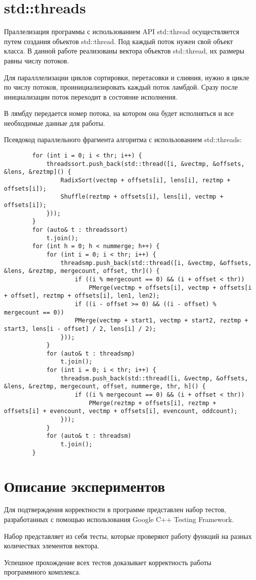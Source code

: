\documentclass{report}
\begin{document}
	\section*{std::threads}
	Праллелизация программы с использованием API std::thread осуществляется путем создания объектов std::thread. Под каждый поток нужен свой объект класса. В данной работе реализованы вектора объектов std::thread, их размеры равны числу потоков.
	\par Для паралллелизации циклов сортировки, перетасовки и слияния, нужно в цикле по числу потоков, проинициализировать каждый поток ламбдой. Сразу после инициализации поток переходит в состояние исполнения. 
	\par В лямбду передается номер потока, на котором она будет исполняться и все необходимые данные для работы.
	\par Псевдокод параллельного фрагмента алгоритма с использованием std::threads:
	\begin{lstlisting}
		for (int i = 0; i < thr; i++) {
			threadssort.push_back(std::thread([i, &vectmp, &offsets, &lens, &reztmp]() {
				RadixSort(vectmp + offsets[i], lens[i], reztmp + offsets[i]);
				Shuffle(reztmp + offsets[i], lens[i], vectmp + offsets[i]);
			}));
		}
		for (auto& t : threadssort)
			t.join();
		for (int h = 0; h < nummerge; h++) {
			for (int i = 0; i < thr; i++) {
				threadsmp.push_back(std::thread([i, &vectmp, &offsets, &lens, &reztmp, mergecount, offset, thr]() {
					if ((i % mergecount == 0) && (i + offset < thr)) 
						PMerge(vectmp + offsets[i], vectmp + offsets[i + offset], reztmp + offsets[i], len1, len2);
					if ((i - offset >= 0) && ((i - offset) % mergecount == 0)) 
					PMerge(vectmp + start1, vectmp + start2, reztmp + start3, lens[i - offset] / 2, lens[i] / 2);
				}));
			}
			for (auto& t : threadsmp)
				t.join();
			for (int i = 0; i < thr; i++) {
				threadsm.push_back(std::thread([i, &vectmp, &offsets, &lens, &reztmp, mergecount, offset, nummerge, thr, h]() {
					if ((i % mergecount == 0) && (i + offset < thr)) 
						PMerge(reztmp + offsets[i], reztmp + offsets[i] + evencount, vectmp + offsets[i], evencount, oddcount);
				}));
			}
			for (auto& t : threadsm)
				t.join();
		}
	\end{lstlisting}
	\newpage
	
	\section*{Описание экспериментов}
	Для подтверждения корректности в программе представлен набор тестов, разработанных с помощью использования Google C++ Testing Framework.
	\par Набор представляет из себя тесты, которые проверяют работу функций на разных количествах элементов вектора.
	\par Успешное прохождение всех тестов доказывает корректность работы программного комплекса.
	\newpage
	
\end{document}
